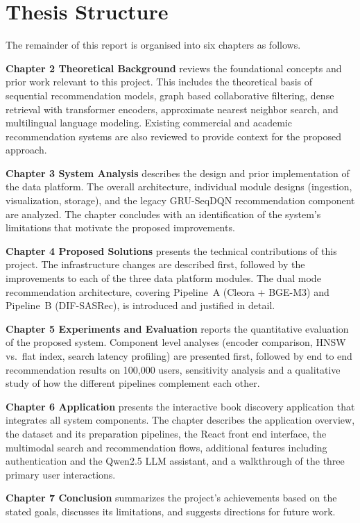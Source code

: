\section{Thesis Structure}
\label{sec:thesis_structure}

The remainder of this report is organised into six chapters as follows.

\textbf{Chapter 2 Theoretical Background} reviews the foundational concepts and prior work relevant to this project.
This includes the theoretical basis of sequential recommendation models, graph based collaborative filtering, dense retrieval with transformer encoders, approximate nearest neighbor search, and multilingual language modeling.
Existing commercial and academic recommendation systems are also reviewed to provide context for the proposed approach.

\textbf{Chapter 3 System Analysis} describes the design and prior implementation of the data platform.
The overall architecture, individual module designs (ingestion, visualization, storage), and the legacy GRU-SeqDQN recommendation component are analyzed.
The chapter concludes with an identification of the system's limitations that motivate the proposed improvements.

\textbf{Chapter 4 Proposed Solutions} presents the technical contributions of this project.
The infrastructure changes are described first, followed by the improvements to each of the three data platform modules.
The dual mode recommendation architecture, covering Pipeline~A (Cleora + BGE-M3) and Pipeline~B (DIF-SASRec), is introduced and justified in detail.

\textbf{Chapter 5 Experiments and Evaluation} reports the quantitative evaluation of the proposed system.
Component level analyses (encoder comparison, HNSW vs.\ flat index, search latency profiling) are presented first, followed by end to end recommendation results on 100{,}000 users, sensitivity analysis and a qualitative study of how the different pipelines complement each other.

\textbf{Chapter 6 Application} presents the interactive book discovery application that integrates all system components.
The chapter describes the application overview, the dataset and its preparation pipelines, the React front end interface, the multimodal search and recommendation flows, additional features including authentication and the Qwen2.5 LLM assistant, and a walkthrough of the three primary user interactions.

\textbf{Chapter 7 Conclusion} summarizes the project’s achievements based on the stated goals, discusses its limitations, and suggests directions for future work.

